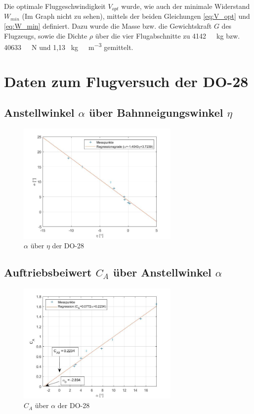 Die optimale Fluggeschwindigkeit $V_{opt}$ wurde, wie auch der minimale Widerstand $W_{min}$ (Im Graph nicht zu sehen), mittels der beiden Gleichungen \ref{eq:V_opt} und \ref{eq:W_min} definiert. Dazu wurde die Masse bzw. die Gewichtskraft $G$ des Flugzeugs, sowie die Dichte $\rho$ über die vier Flugabschnitte zu \SI{4142}{\ \kilogram} bzw. \SI{40633}{\ \newton} und 1,13 \SI{}{\kilogram\ \meter^{-3}} gemittelt.

\section{Daten zum Flugversuch der DO-28}

\subsection{Anstellwinkel $\alpha$ über Bahnneigungswinkel $\eta$}

\begin{figure}[H]
	\centering	\includegraphics[width=0.7\textwidth]{./Bilder/alpha_eta_plot.jpg}
	\caption{$\alpha$ über $\eta$ der DO-28}
	\label{fig:alpha_eta_DO28}
\end{figure}

\subsection{Auftriebsbeiwert $C_{A}$ über Anstellwinkel $\alpha$}

\begin{figure}[H]
	\centering	\includegraphics[width=0.7\textwidth]{./Bilder/CA_alpha_plot.jpg}
	\caption{$C_{A}$ über $\alpha$ der DO-28}
	\label{fig:CA_alpha_DO28}
\end{figure}

